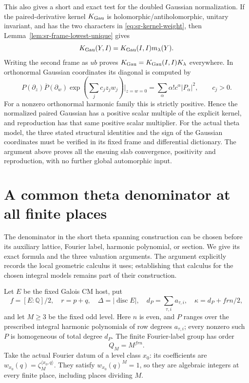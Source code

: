 This also gives a short and exact test for the doubled Gaussian
normalization.  If the paired-derivative kernel \(K_{\rm Gau}\)
is holomorphic/antiholomorphic, unitary invariant, and has the
two characters in \eqref{eq:sr-kernel-weight}, then
Lemma~\ref{lem:sr-frame-lowest-unique} gives
\[
 K_{\rm Gau}(Y,I)=K_{\rm Gau}(I,I)m_\lambda(Y).
\]
Writing the second frame as \(ub\) proves
\(K_{\rm Gau}=K_{\rm Gau}(I,I)K_\lambda\) everywhere.
In orthonormal Gaussian coordinates its diagonal is computed
by
\[
 P(\partial_z)\overline P(\partial_w)
          \exp\!\left(\sum_j c_jz_jw_j\right)\big|_{z=w=0}
      =\sum_\alpha\alpha!c^\alpha|P_\alpha|^2,
      \qquad c_j>0 .
\]
For a nonzero orthonormal harmonic family this is strictly
positive.  Hence the normalized paired Gaussian has a positive
scalar multiple of the explicit kernel, and reproduction has
that same positive scalar multiplier.
For the actual theta model, the three stated structural
identities and the sign of the Gaussian coordinates must be
verified in its fixed frame and differential dictionary.
The argument above proves all the ensuing slab convergence,
positivity and reproduction, with no further global
automorphic input.

\section{A common theta denominator at all finite places}
\label{sec:sr-theta-common-denominator}

The denominator in the short theta spanning construction can be chosen
before its auxiliary lattice, Fourier label, harmonic polynomial, or
section.  We give its exact formula and the three valuation arguments.
The argument explicitly records the local geometric calculus it uses;
establishing that calculus for the chosen integral models remains part
of their construction.

Let \(E\) be the fixed Galois CM host, put
\[
 f=[E:\mathbb Q]/2,\quad r=p+q,\quad
 \Delta=|\operatorname{disc}E|,\quad
 d_P=\sum_{\tau,i}a_{\tau,i},\quad
 \kappa=d_P+frn/2,
\]
and let \(M\ge3\) be the fixed odd level.
Here \(n\) is even, and \(P\) ranges over the prescribed integral
harmonic polynomials of row degrees \(a_{\tau,i}\); every nonzero
such \(P\) is homogeneous of total degree \(d_P\).
The finite Fourier-label group has order
\[
 Q_M=M^{frn}.
\]
Take the actual Fourier datum of a level class \(x_0\):
its coefficients are
\(w_{x_0}(q)=\zeta_M^{\langle x_0,q\rangle}\).
They satisfy \(w_{x_0}(q)^M=1\), so they are algebraic integers
at every finite place, including places dividing \(M\).

